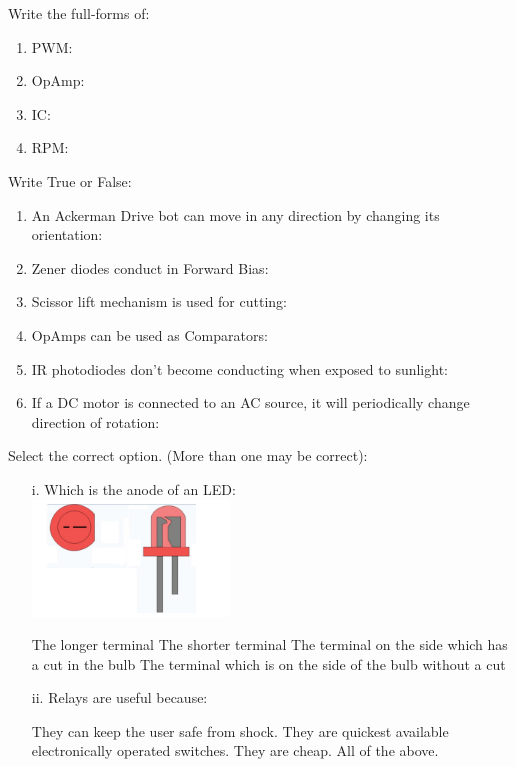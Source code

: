 \documentclass[12pt]{exam}
\begin{document}
\begin{questions}

\question[2]Write the full-forms of:
\begin{enumerate}
\item PWM:   \makebox[5in]{\hrulefill}
\item OpAmp: \makebox[5in]{\hrulefill}
\item IC: \makebox[5in]{\hrulefill}
\item RPM: \makebox[5in]{\hrulefill}
\end{enumerate}

\question[3] Write True or False:
\begin{enumerate}

\item An Ackerman Drive bot can move in any direction by changing its orientation:
\item  Zener diodes conduct in Forward Bias: 
\item  Scissor lift mechanism is used for cutting:
\item  OpAmps can be used as Comparators:
\item  IR photodiodes don’t become conducting when exposed to sunlight:
\item If a DC motor is connected to an AC source, it will periodically change direction of rotation:
\end{enumerate}

\question[10] Select the correct option. (More than one may be correct):
\begin{enumerate}
\item[i.] Which is the anode of an LED:\\
\includegraphics[scale=1]{LED.png}

\begin{choices}
\choice 	The longer terminal
\choice The shorter terminal
\choice The terminal on the side which has a cut in the bulb
\choice  The terminal which is on the side of the bulb without a cut
\addpoints

\end{choices}
\item[ii.] Relays are useful because:
\begin{choices}
\choice They can keep the user safe from shock.
\choice They are quickest available electronically operated switches.
\choice They are cheap.
\choice All of the above.
\end{choices}





\end{enumerate}
\end{questions}
\end{document}
